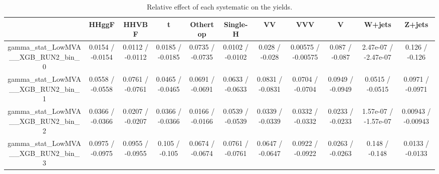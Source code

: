 \documentclass[10pt]{article}
\begin{document}
\begin{table}[htbp]
\begin{center}
\begin{tabular}{|c|c|c|c|c|c|c|c|c|c|c|}
\hline 
      & HHggF      & HHVBF      & t      & Othertop      & Single-H      & VV      & VVV      & V      & W+jets      & Z+jets \\ 
\hline 
  gamma_stat_LowMVA__XGB_RUN2_bin_0 & 0.0154 / -0.0154 & 0.0112 / -0.0112 & 0.0185 / -0.0185 & 0.0735 / -0.0735 & 0.0102 / -0.0102 & 0.028 / -0.028 & 0.00575 / -0.00575 & 0.087 / -0.087 & 2.47e-07 / -2.47e-07 & 0.126 / -0.126 \\ 
  gamma_stat_LowMVA__XGB_RUN2_bin_1 & 0.0558 / -0.0558 & 0.0761 / -0.0761 & 0.0465 / -0.0465 & 0.0691 / -0.0691 & 0.0633 / -0.0633 & 0.0831 / -0.0831 & 0.0704 / -0.0704 & 0.0949 / -0.0949 & 0.0515 / -0.0515 & 0.0971 / -0.0971 \\ 
  gamma_stat_LowMVA__XGB_RUN2_bin_2 & 0.0366 / -0.0366 & 0.0207 / -0.0207 & 0.0366 / -0.0366 & 0.0166 / -0.0166 & 0.0539 / -0.0539 & 0.0339 / -0.0339 & 0.0332 / -0.0332 & 0.0233 / -0.0233 & 1.57e-07 / -1.57e-07 & 0.00943 / -0.00943 \\ 
  gamma_stat_LowMVA__XGB_RUN2_bin_3 & 0.0975 / -0.0975 & 0.0955 / -0.0955 & 0.105 / -0.105 & 0.0674 / -0.0674 & 0.0761 / -0.0761 & 0.0647 / -0.0647 & 0.0922 / -0.0922 & 0.0263 / -0.0263 & 0.148 / -0.148 & 0.0133 / -0.0133 \\ 
\hline 
\end{tabular} 
\caption{Relative effect of each systematic on the yields.} 
\end{center} 
\end{table} 
\end{document}
